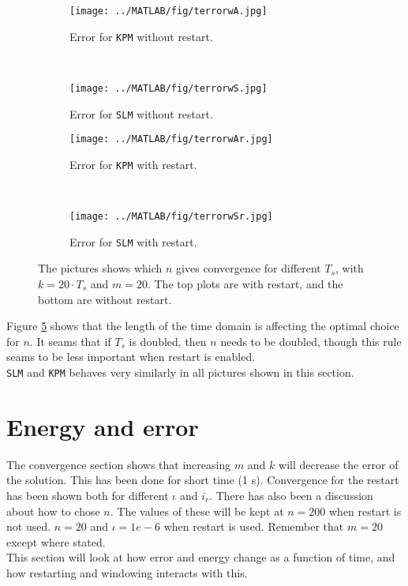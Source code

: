 \begin{figure}[H]
        \centering
        \begin{subfigure}[b]{0.3\textwidth}
                \texttt{[image: ../MATLAB/fig/terrorwA.jpg]}
                \caption{ Error for \texttt{KPM} without restart. }
                \label{fig:terrorwA}
        \end{subfigure}
		~
		\begin{subfigure}[b]{0.3\textwidth}
                \texttt{[image: ../MATLAB/fig/terrorwS.jpg]}
                \caption{ Error for \texttt{SLM} without restart. }
                \label{fig:terrorwS}
        \end{subfigure}
        
        \begin{subfigure}[b]{0.3\textwidth}
                \texttt{[image: ../MATLAB/fig/terrorwAr.jpg]}
                \caption{ Error for \texttt{KPM} with restart. }
                \label{fig:terrorwAr}
        \end{subfigure}
		~
		\begin{subfigure}[b]{0.3\textwidth}
                \texttt{[image: ../MATLAB/fig/terrorwSr.jpg]}
                \caption{ Error for \texttt{SLM} with restart. }
                \label{fig:terrorwSr}
        \end{subfigure}        
        
        \caption{ The pictures shows which $n$ gives convergence for different $T_s$, with $k = 20 \cdot T_s$ and $m = 20$. The top plots are with restart, and the bottom are without restart.}
        \label{fig:rest}
\end{figure}
Figure \ref{fig:rest} shows that the length of the time domain is affecting the optimal choice for $n$. It seams that if $T_s$ is doubled, then $n$ needs to be doubled, though this rule seams to be less important when restart is enabled. \\
\texttt{SLM} and \texttt{KPM} behaves very similarly in all pictures shown in this section. \\

\section{ Energy and error }%
\label{sec:resultconsterergy}
The convergence section shows that increasing $m$ and $k$ will decrease the error of the solution. This has been done for short time (1 s). Convergence for the restart has been shown both for different $\iota$ and $i_r$. There has also been a discussion about how to chose $n$. The values of these will be kept at $n = 200$ when restart is not used. $n = 20$ and $\iota = 1e-6$ when restart is used. Remember that $m = 20$ except where stated. \\This section will look at how error and energy change as a function of time, and how restarting and windowing interacts with this.


